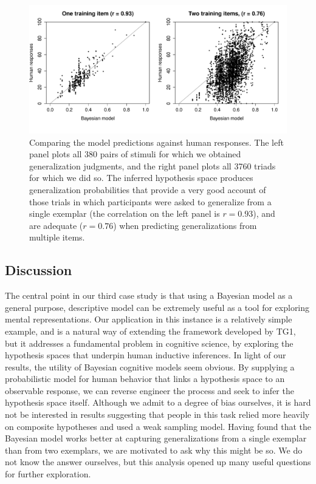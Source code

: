 \documentclass[doc,floatsintext]{apa6}
\begin{document}
\begin{figure}[p]
\begin{center}
	\includegraphics[width=14cm]{generalization_figs/allitems.pdf}
\vspace*{12pt}
\caption{Comparing the model predictions against human responses. The left panel plots all 380 pairs of stimuli for which we obtained generalization judgments, and the right panel plots all 3760 triads for which we did so. The inferred hypothesis space produces generalization probabilities that provide a very good account of those trials in which participants were asked to generalize from a single exemplar (the correlation on the left panel is $r=0.93$), and are adequate ($r=0.76$) when predicting generalizations from multiple items.}
\label{fig:gen_fit}
\end{center}
\end{figure}

\subsection*{Discussion}

The central point in our third case study is that using a Bayesian model as a general purpose, descriptive model can be extremely useful as a tool for exploring mental representations. Our application in this instance is a relatively simple example, and is a natural way of extending the framework developed by TG1, but it addresses a fundamental problem in cognitive science, by exploring the hypothesis spaces that underpin human inductive inferences. In light of our results, the utility of Bayesian cognitive models seem obvious. By supplying a probabilistic model for human behavior that links a hypothesis space to an observable response, we can reverse engineer the process and seek to infer the hypothesis space itself. Although we admit to a degree of bias ourselves, it is hard not be interested in results suggesting that people in this task relied more heavily on composite hypotheses and used a weak sampling model. Having found that the Bayesian model works better at capturing generalizations from a single exemplar than from two exemplars, we are motivated to ask why this might be so. We do not know the answer ourselves, but this analysis opened up many useful questions for further exploration.
\end{document}
